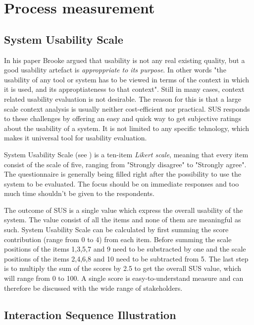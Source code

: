 \documentclass[12pt,a4paper,oneside,pdftex]{report}
\begin{document}
  

\section{Process measurement}
\label{sec:measurement}
    
        \subsection{System Usability Scale}
	In his paper Brooke \cite{RefWorks:10} argued that usability is not any real existing quality, but a good usability artefact is \emph{approppriate to its purpose}. In other words "the usability of any tool or system has to be viewed in terms of the context in which it is 			used, and its approptiateness to that context"\cite{RefWorks:10}. Still in many cases, context related usability evaluation is not desirable. The reason for this is that a large scale context analysis is usually neither cost-efficient nor practical.\cite{RefWorks:10} 
	SUS responds to these challenges by offering an easy and quick way to get subjective ratings about the usability of a system. It is not limited to any specific tehnology, which makes it universal tool for usability evaluation. \cite{RefWorks:12}

	System Usability Scale (see ) is a ten-item \emph{Likert scale}, meaning that every item consist of the scale of five, ranging from "Strongly disagree" to "Strongly agree". The questionnaire is generally being filled right after the possibility to use 		the system to be evaluated. The focus should be on immediate responses and too much time shouldn't be given to the respondents. \cite{RefWorks:10} 

	The outcome of SUS is a single value which express the overall usability of the system. The value consist of all the items and none of them are meaningful as such. System Usability Scale can be calculated by first summing the score contribution (range from 0 to 4) 			from each item. Before summing the scale positions of the items 1,3,5,7 and 9 need to be substracted by one and the scale positions of the items 2,4,6,8 and 10 need to be subtracted from 5. The last step is to multiply the sum of the scores by 2.5 to get the overall 			SUS value, which will range from 0 to 100. \cite{RefWorks:10} A single score is easy-to-understand measure and can therefore be discussed with the wide range of stakeholders. \cite{RefWorks:12} 
        \subsection{Interaction Sequence Illustration}
\end{document}

